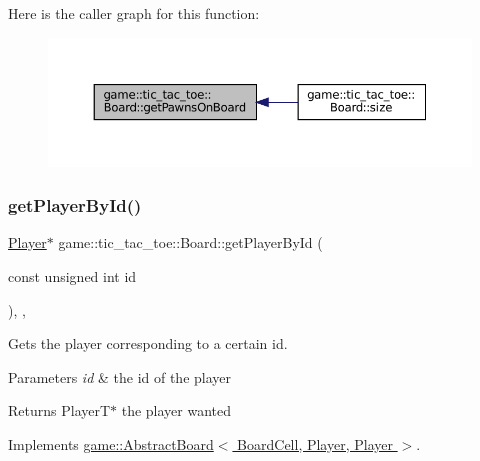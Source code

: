 Here is the caller graph for this function\+:
\nopagebreak
\begin{figure}[H]
\begin{center}
\leavevmode
\includegraphics[width=350pt]{classgame_1_1tic__tac__toe_1_1_board_a84cb90a6d844d80ecd5857fb4dc9ad1a_icgraph}
\end{center}
\end{figure}
\mbox{\label{classgame_1_1tic__tac__toe_1_1_board_a7907b8fc363b7e33d585edbc7ec102ae}} 
\subsubsection{\texorpdfstring{get\+Player\+By\+Id()}{getPlayerById()}}
{\footnotesize\ttfamily \hyperlink{classgame_1_1tic__tac__toe_1_1_player}{Player}$\ast$ game\+::tic\+\_\+tac\+\_\+toe\+::\+Board\+::get\+Player\+By\+Id (\begin{DoxyParamCaption}\item[{const unsigned int}]{id }\end{DoxyParamCaption})\hspace{0.3cm}{\ttfamily [inline]}, {\ttfamily [override]}, {\ttfamily [virtual]}}



Gets the player corresponding to a certain id. 


\begin{DoxyParams}{Parameters}
{\em id} & the id of the player \\
\hline
\end{DoxyParams}
\begin{DoxyReturn}{Returns}
Player\+T$\ast$ the player wanted 
\end{DoxyReturn}


Implements \hyperlink{classgame_1_1_abstract_board_a2ae30faf6d02d6d9757020a7ed7932cc}{game\+::\+Abstract\+Board$<$ Board\+Cell, Player, Player $>$}.

